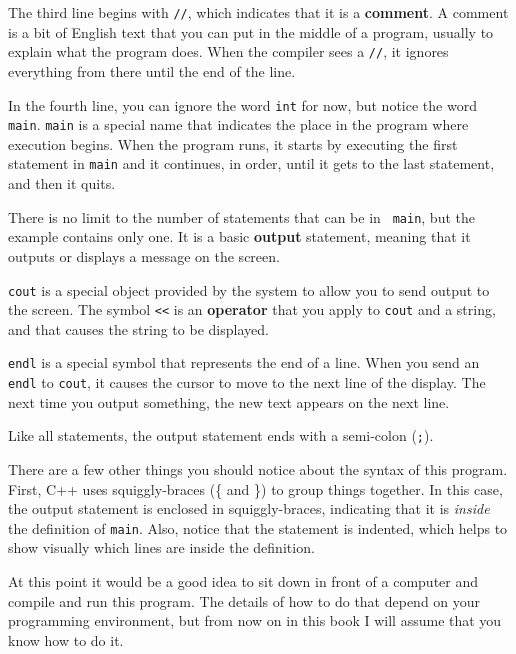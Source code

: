 
The third line begins with {\tt //}, which indicates
that it is a {\bf comment}.  A comment is a bit of
English text that you can put in the middle of a program,
usually to explain what the program does.  When the compiler
sees a {\tt //}, it ignores everything from there until the end
of the line.

In the fourth line, you can ignore the word {\tt int}
for now, but notice the word {\tt main}.  {\tt main} is a
special name that indicates the place in the program where execution
begins.  When the program runs, it starts by executing the first
statement in {\tt main} and it continues, in order, until it gets
to the last statement, and then it quits.


There is no limit to the number of statements that can be in {\tt
main}, but the example contains only one.  It is a basic {\bf
output} statement, meaning that it outputs or displays a message on
the screen.  

{\tt cout} is a special object provided by the system to allow
you to send output to the screen.  The symbol {\tt <<} is an
{\bf operator} that you apply to {\tt cout} and a string, and that
causes the string to be displayed.


{\tt endl} is a special symbol that represents the end of a
line.  When you send an {\tt endl} to {\tt cout}, it causes the
cursor to move to the next line of the display.
The next time you output something, the new text appears
on the next line.

Like all statements, the output statement ends with a
semi-colon ({\tt ;}).

There are a few other things you should notice about the syntax of
this program.  First, C++ uses squiggly-braces (\{ and
\}) to group things together.  In this case, the output statement
is enclosed in squiggly-braces, indicating that it is {\em inside} the
definition of {\tt main}.  Also, notice that the statement is
indented, which helps to show visually which lines are inside the
definition.

At this point it would be a good idea to sit down in front of
a computer and compile and run this program.  The details of how
to do that depend on your programming environment, but from now
on in this book I will assume that you know how to do it.

